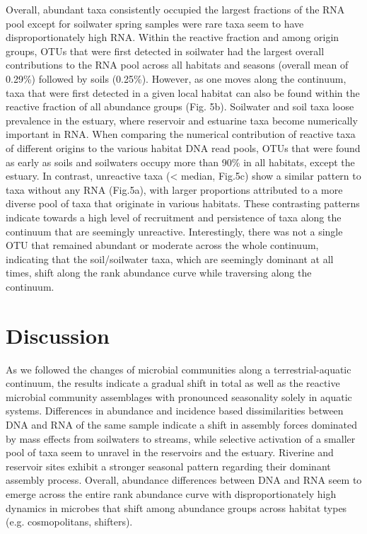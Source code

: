 \documentclass[12pt,a4paper]{article} %
\begin{document}
Overall, abundant taxa consistently occupied the largest fractions of the RNA pool except for soilwater spring samples were rare taxa seem to have disproportionately high RNA. Within the reactive fraction and among origin groups, OTUs that were first detected in soilwater had the largest overall contributions to the RNA pool across all habitats and seasons (overall mean of 0.29\%) followed by soils (0.25\%). However, as one moves along the continuum, taxa that were first detected in a given local habitat can also be found within the reactive fraction of all abundance groups (Fig. 5b). Soilwater and soil taxa loose prevalence in the estuary, where reservoir and estuarine taxa become numerically important in RNA. When comparing the numerical contribution of reactive taxa of different origins to the various habitat DNA read pools, OTUs that were found as early as soils and soilwaters occupy more than 90\% in all habitats, except the estuary. In contrast, unreactive taxa (< median, Fig.5c) show a similar pattern to taxa without any RNA (Fig.5a), with larger proportions attributed to a more diverse pool of taxa that originate in various habitats. These contrasting patterns indicate towards a high level of recruitment and persistence of taxa along the continuum that are seemingly unreactive. Interestingly, there was not a single OTU that remained abundant or moderate across the whole continuum, indicating that the soil/soilwater taxa, which are seemingly dominant at all times, shift along the rank abundance curve while traversing along the continuum.

\section*{Discussion}
As we followed the changes of microbial communities along a terrestrial-aquatic continuum, the results indicate a gradual shift in total as well as the reactive microbial community assemblages with pronounced seasonality solely in aquatic systems. Differences in abundance and incidence based dissimilarities between DNA and RNA of the same sample indicate a shift in assembly forces dominated by mass effects from soilwaters to streams, while selective activation of a smaller pool of taxa seem to unravel in the reservoirs and the estuary. Riverine and reservoir sites exhibit a stronger seasonal pattern regarding their dominant assembly process. Overall, abundance differences between DNA and RNA seem to emerge across the entire rank abundance curve with disproportionately high dynamics in microbes that shift among abundance groups across habitat types (e.g. cosmopolitans, shifters).
\end{document}
